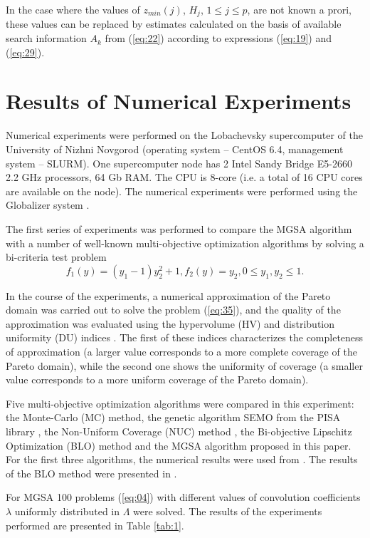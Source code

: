 \documentclass[runningheads]{llncs}
\begin{document}
In the case where the values of $z_{min} (j)$, $H_j$, $1 \leq j \leq p$, are not known a prori, these values can be replaced by estimates calculated on the basis of available search information $A_k$ from (\ref{eq:22}) according to expressions (\ref{eq:19}) and (\ref{eq:29}).


\section{Results of Numerical Experiments} \label{sec:05}

Numerical experiments were performed on the Lobachevsky supercomputer of the University of Nizhni Novgorod (operating system -- CentOS 6.4, management system -- SLURM). One supercomputer node has 2 Intel Sandy Bridge E5-2660 2.2 GHz processors, 64 Gb RAM. The CPU is 8-core (i.e. a total of 16 CPU cores are available on the node). The numerical experiments were performed using the Globalizer system \cite{c38}.

      The first series of experiments was performed to compare the MGSA algorithm with a number of well-known multi-objective optimization algorithms by solving a bi-criteria test problem \cite{c40}
\begin{equation}
\label{eq:35}
f_1 (y)=(y_1-1) y_2^2+1,f_2 (y)=y_2, 0 \leq y_1, y_2 \leq 1.
\end{equation}

In the course of the experiments, a numerical approximation of the Pareto domain was carried out to solve the problem (\ref{eq:35}), and the quality of the approximation was evaluated using the hypervolume (HV) and distribution uniformity (DU) indices \cite{c37,c40}. The first of these indices characterizes the completeness of approximation (a larger value corresponds to a more complete coverage of the Pareto domain), while the second one shows the uniformity of coverage (a smaller value corresponds to a more uniform coverage of the Pareto domain).

Five multi-objective optimization algorithms were compared in this experiment: the Monte-Carlo (MC) method, the genetic algorithm SEMO from the PISA library \cite{c42}, the Non-Uniform Coverage (NUC) method \cite{c40}, the Bi-objective Lipschitz Optimization (BLO) method \cite{c39} and the MGSA algorithm proposed in this paper. For the first three algorithms, the numerical results were used from \cite{c41}. The results of the BLO method were presented in \cite{c39}.

For MGSA 100 problems (\ref{eq:04}) with different values of convolution coefficients $\lambda$ uniformly distributed in $\Lambda$ were solved. The results of the experiments performed are presented in Table \ref{tab:1}.
\end{document}
